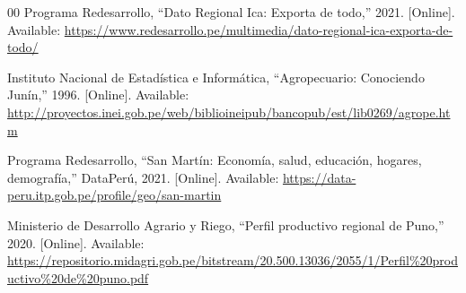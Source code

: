 \documentclass[conference]{IEEEtran}
\begin{document}
\begin{thebibliography}{00}
Programa Redesarrollo, ``Dato Regional Ica: Exporta de todo,'' 2021. [Online]. Available: \url{https://www.redesarrollo.pe/multimedia/dato-regional-ica-exporta-de-todo/}

Instituto Nacional de Estadística e Informática, ``Agropecuario: Conociendo Junín,'' 1996. [Online]. Available: \url{http://proyectos.inei.gob.pe/web/biblioineipub/bancopub/est/lib0269/agrope.htm}

Programa Redesarrollo, ``San Martín: Economía, salud, educación, hogares, demografía,'' DataPerú, 2021. [Online]. Available: \url{https://data-peru.itp.gob.pe/profile/geo/san-martin}

Ministerio de Desarrollo Agrario y Riego, ``Perfil productivo regional de Puno,'' 2020. [Online]. Available: \url{https://repositorio.midagri.gob.pe/bitstream/20.500.13036/2055/1/Perfil%20productivo%20de%20puno.pdf}

\end{thebibliography}
\end{document}
